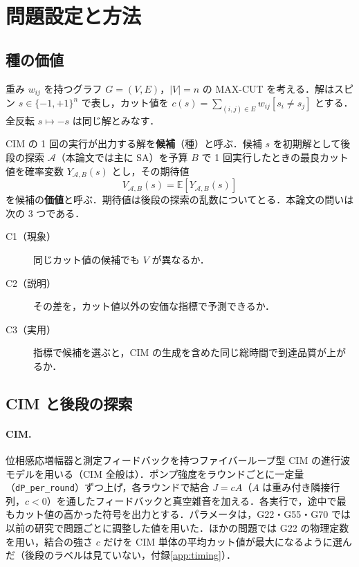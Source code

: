\section{問題設定と方法}\label{sec:method}

\subsection{種の価値}

重み $w_{ij}$ を持つグラフ $G=(V,E)$，$|V|=n$ の MAX-CUT を考える．解はスピン $s\in\{-1,+1\}^n$ で表し，カット値を $c(s)=\sum_{(i,j)\in E} w_{ij}[s_i\neq s_j]$ とする．全反転 $s\mapsto -s$ は同じ解とみなす．

CIM の 1 回の実行が出力する解を\textbf{候補}（種）と呼ぶ．候補 $s$ を初期解として後段の探索 $\mathcal{A}$（本論文では主に SA）を予算 $B$ で 1 回実行したときの最良カット値を確率変数 $Y_{\mathcal{A},B}(s)$ とし，その期待値
\begin{equation}
  V_{\mathcal{A},B}(s) = \mathbb{E}\left[Y_{\mathcal{A},B}(s)\right]
\end{equation}
を候補の\textbf{価値}と呼ぶ．期待値は後段の探索の乱数についてとる．本論文の問いは次の 3 つである．

\begin{description}
  \item[C1（現象）] 同じカット値の候補でも $V$ が異なるか．
  \item[C2（説明）] その差を，カット値以外の安価な指標で予測できるか．
  \item[C3（実用）] 指標で候補を選ぶと，CIM の生成を含めた同じ総時間で到達品質が上がるか．
\end{description}

\subsection{CIM と後段の探索}

\paragraph{CIM.} 位相感応増幅器と測定フィードバックを持つファイバーループ型 CIM の進行波モデル\cite{inoue2022}を用いる（CIM 全般は\cite{wang2013,inagaki2016,mcmahon2016}）．ポンプ強度をラウンドごとに一定量（\texttt{dP\_per\_round}）ずつ上げ，各ラウンドで結合 $J=cA$（$A$ は重み付き隣接行列，$c<0$）を通したフィードバックと真空雑音を加える．各実行で，途中で最もカット値の高かった符号を出力とする．パラメータは，G22・G55・G70 では以前の研究で問題ごとに調整した値を用いた．ほかの問題では G22 の物理定数を用い，結合の強さ $c$ だけを CIM 単体の平均カット値が最大になるように選んだ（後段のラベルは見ていない，付録\ref{app:timing}）．

